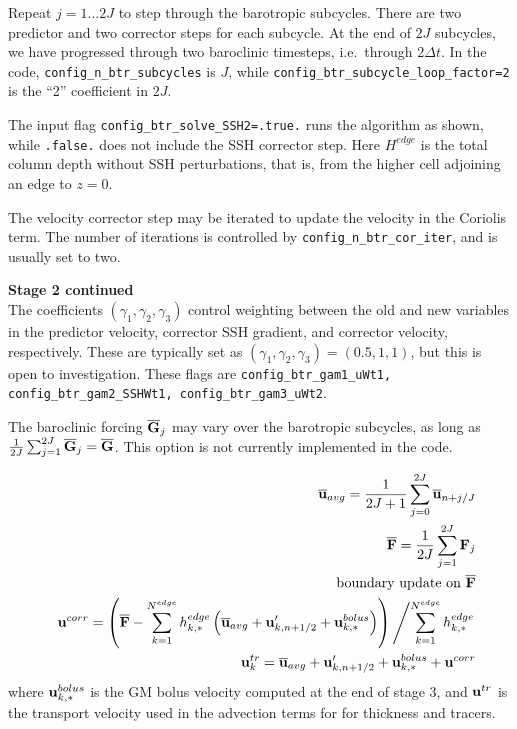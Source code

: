 \documentclass[11pt]{report}
\begin{document}
Repeat $j=1\ldots 2J$ to step through the barotropic subcycles.  There are two predictor and two corrector steps for each subcycle.  At the end of $2J$ subcycles, we have progressed through two baroclinic timesteps, i.e.\ through $2\Delta t$.  In the code, {\tt config\_n\_btr\_subcycles} is $J$, while {\tt config\_btr\_subcycle\_loop\_factor=2} is the ``2'' coefficient in $2J$.  

The input flag {\tt config\_btr\_solve\_SSH2=.true.} runs the algorithm as shown, while {\tt .false.} does not include the SSH corrector step.  Here $H^{edge}$ is the total column depth without SSH perturbations, that is, from the higher cell adjoining an edge to $z=0$.

The velocity corrector step may be iterated to update the velocity in the Coriolis term.  The number of iterations is controlled by {\tt config\_n\_btr\_cor\_iter}, and is usually set to two.

\newpage
{\bf Stage 2 continued}\\

The coefficients $(\gamma_1,\gamma_2,\gamma_3)$ control weighting between the old and new variables in the predictor velocity, corrector SSH gradient, and corrector velocity, respectively.  These are typically set as $(\gamma_1,\gamma_2,\gamma_3)=(0.5,1,1)$, but this is open to investigation.  These flags are 
{\tt config\_btr\_gam1\_uWt1, config\_btr\_gam2\_SSHWt1, config\_btr\_gam3\_uWt2}.

The baroclinic forcing ${\overline {\bf G}}_j$ may vary over the barotropic subcycles, as long as 
$\frac{1}{2J}\sum_{j=1}^{2J}{\overline {\bf G}}_j={\overline {\bf G}}$.  This option is not currently implemented in the code.

\begin{eqnarray} &&  
\overline{\bf u}_{avg} = \frac{1}{2J+1} \sum_{j=0}^{2J} \overline{\bf u}_{n+j/J} 
\label{ustar5}\\&&
{\overline {\bf F}} = \frac{1}{2J} \sum_{j=1}^{2J}{\bf F}_j \\&&
\mbox{boundary update on }{\overline {\bf F}}
\\&&
{\bf u}^{corr} = \left( {\overline {\bf F}} 
  - \sum_{k=1}^{N^{edge}} h_{k,*}^{edge} 
   \left( \overline{\bf u}_{avg} + {\bf u}'_{k,n+1/2} + {\bf u}_{k,*}^{bolus}\right) \right)
\left/ \sum_{k=1}^{N^{edge}} h_{k,*}^{edge}   \right. \label{ucorr}
\\ &&
{\bf u}^{tr}_k = \overline{\bf u}_{avg} + {\bf u}'_{k,n+1/2} + {\bf u}_{k,*}^{bolus} + {\bf u}^{corr} \label{utr}
\end{eqnarray}
where ${\bf u}_{k,*}^{bolus}$ is the GM bolus velocity computed at the end of stage 3, and ${\bf u}^{tr}$ is the transport velocity used in the advection terms for for thickness and tracers.
\end{document}
